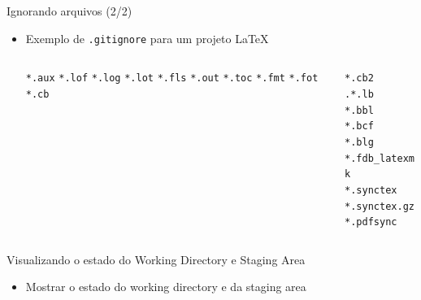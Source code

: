 \documentclass[aspectratio=169,14pt]{beamer}
\begin{document}
\begin{frame}[fragile]{Ignorando arquivos (2/2)}
    \begin{itemize}
        \item Exemplo de \texttt{.gitignore} para um projeto \LaTeX\\
        \begin{columns}
            \begin{column}{0.1\textwidth}
                \texttt{*.aux}
                \texttt{*.lof}
                \texttt{*.log}
                \texttt{*.lot}
                \texttt{*.fls}
                \texttt{*.out}
                \texttt{*.toc}
                \texttt{*.fmt}
                \texttt{*.fot}
                \texttt{*.cb}
            \end{column}
            \begin{column}{0.5\textwidth}                
                \texttt{*.cb2}\\
                \texttt{.*.lb}\\
                \texttt{*.bbl}\\
                \texttt{*.bcf}\\
                \texttt{*.blg}\\
                \texttt{*.fdb\_latexmk}\\
                \texttt{*.synctex}\\
                \texttt{*.synctex.gz}\\
                \texttt{*.pdfsync}
            \end{column}
        \end{columns}
    \end{itemize}    
\end{frame}

\begin{frame}[fragile]{Visualizando o estado do Working Directory e Staging Area}
    \begin{itemize}
        \item Mostrar o estado do working directory e da staging area
    \end{itemize}
\end{frame}
\end{document}
